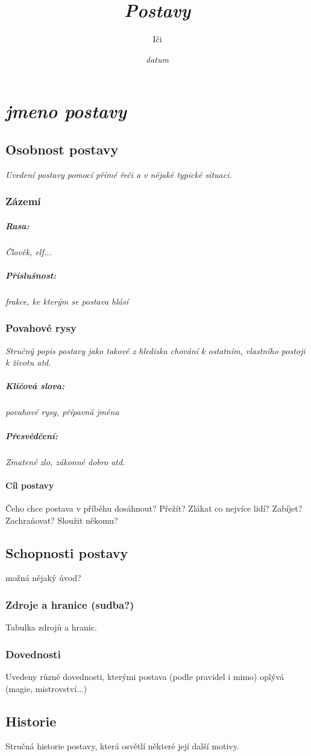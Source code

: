\documentclass[letterpaper,twocolumn,openany,nodeprecatedcode]{dndbook}
\title{\textit{Postavy}}
\author{Iči}
\date{\textit{datum}}
\begin{document}
\chapter{\textit{jmeno postavy}}
\section{Osobnost postavy}
\textit{Uvedení postavy pomocí přímé řeči a v nějaké typické situaci.}
\subsection{Zázemí}
\paragraph{Rasa:} \textit{Člověk, elf...}
\paragraph{Příslušnost:} \textit{frakce, ke kterým se postava hlásí}
\subsection{Povahové rysy}
\textit{Stručný popis postavy jako takové z hlediska chování k ostatním, vlastního postoji k životu atd.}

\paragraph{Klíčová slova: }  \textit{povahové rysy, přípavná jména} \\
\paragraph{Přesvědčení: } \textit{Zmatené zlo, zákonné dobro atd.}  \\

\subsubsection{Cíl postavy}
Čeho chce postava v příběhu dosáhnout? Přežít? Zlákat co nejvíce lidí? Zabíjet? Zachraňovat? Sloužit někomu?


\section{Schopnosti postavy}
možná nějaký úvod?
\subsection{Zdroje a hranice (sudba?)}
Tabulka zdrojů a hranic.
\subsection{Dovednosti}
Uvedeny různé dovednosti, kterými postava (podle pravidel i mimo) oplývá (magie, mistrovství...)

\section{Historie}
Stručná historie postavy, která osvětlí některé její další motivy.
\end{document}
